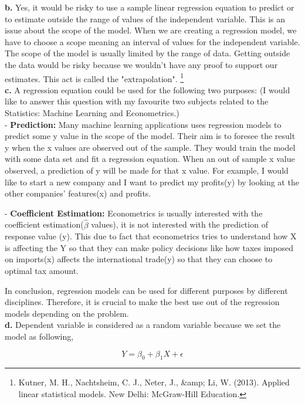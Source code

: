 \documentclass{article}
\begin{document}
\textbf{b.} Yes, it would be risky to use a sample linear regression equation to predict or to estimate outside the range of values of the independent variable. This is an issue about the scope of the model. When we are creating a regression model, we have to choose a scope meaning an interval of values for the independent variable. The scope of the model is usually limited by the range of data. Getting outside the data would be risky because we wouldn't have any proof to support our estimates. This act is called the "extrapolation". \footnote{Kutner, M. H., Nachtsheim, C. J., Neter, J., &amp; Li, W. (2013). Applied linear statistical models. New Delhi: McGraw-Hill Education.}
\\

\textbf{c.} A regression equation could be used for the following two purposes: (I would like to answer this question with my favourite two subjects related to the Statistics: Machine Learning and Econometrics.)
\\

- \textbf{Prediction:} Many machine learning applications uses regression models to predict some y value in the scope of the model. Their aim is to foresee the result y when the x values are observed out of the sample. They would train the model with some data set and fit a regression equation. When an out of sample x value observed, a prediction of y will be made for that x value. For example, I would like to start a new company and I want to predict my profits(y) by looking at the other companies' features(x) and profits. 

- \textbf{Coefficient Estimation:} Econometrics is usually interested with the coefficient estimation($\hat{\beta}$ values), it is not interested with the prediction of response value (y). This due to fact that econometrics tries to understand how X is affecting the Y so that they can make policy decisions like how taxes imposed on imports(x) affects the international trade(y) so that they can choose to optimal tax amount.

In conclusion, regression models can be used for different purposes by different disciplines. Therefore, it is crucial to make the best use out of the regression models depending on the problem.
\\

\textbf{d.} Dependent variable is considered as a random variable because we set the model as following,

\begin{equation}
Y = \beta_0 + \beta_1X + \epsilon
\end{equation}
\end{document}
